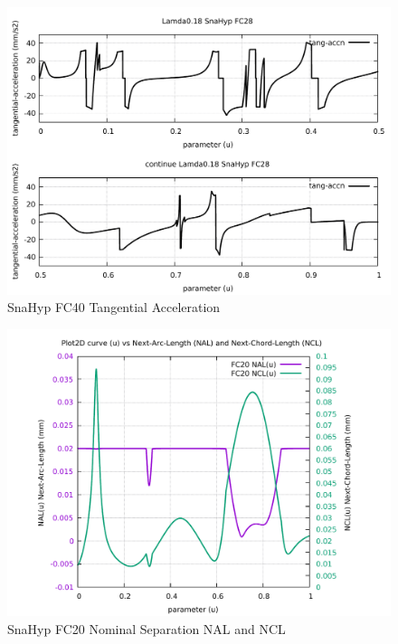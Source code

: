 \begin{figure}
	\caption     {SnaHyp FC40 Tangential Acceleration}
	\label{24-img-SnaHyp-FC40-Tangential-Acceleration.pdf}
\includegraphics[width=1.00\textwidth]{Chap4/appendix/app-SnaHyp/plots/24-img-SnaHyp-FC40-Tangential-Acceleration.pdf}
\end{figure}

\clearpage
\pagebreak

\begin{figure}
	\caption     {SnaHyp FC20 Nominal Separation NAL and NCL}
	\label{25-img-SnaHyp-FC20-Nominal-Separation-NAL-and-NCL.pdf}
\includegraphics[width=1.00\textwidth]{Chap4/appendix/app-SnaHyp/plots/25-img-SnaHyp-FC20-Nominal-Separation-NAL-and-NCL.pdf}
\end{figure}


